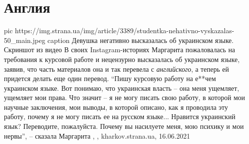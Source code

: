 
 
 
 
 
\chapter{Англия}
\label{sec:slova.anglia}

\ifcmt
  pic https://img.strana.ua/img/article/3389/studentka-nehativno-vyskazalas-50_main.jpeg
	caption Девушка негативно высказалась об украинском языке. Скриншот из видео
\fi
В своих Instagram-историях Маргарита пожаловалась на требования к курсовой
работе и нецензурно высказалась об украинском языке, заявив, что часть
материалов она и так перевела с \emph{английского}, а теперь ей придется делать еще
один перевод.  \enquote{Пишу курсовую работу на е**чем украинском языке. Вот понимаю,
что украинская власть – она меня ущемляет, ущемляет мои права. Что значит – я
не могу писать свою работу, в которой мои научные заключения, мои выводы, в
которой описано, как я проводила эту работу, почему я не могу писать ее на
русском языке... Нравится украинский язык? Переводите, пожалуйста. Почему вы
насилуете меня, мою психику и мои нервы}, – сказала Маргарита
, , kharkov.strana.ua, 16.06.2021

